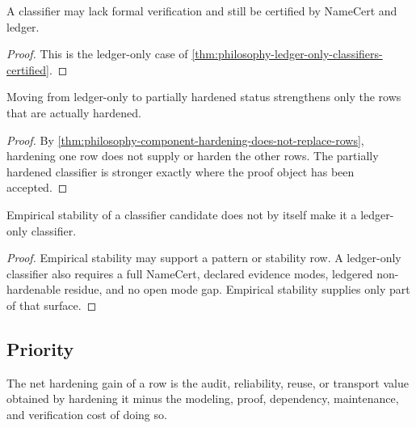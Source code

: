 \begin{corollary}
\label{cor:philosophy-no-formal-proof-not-no-certificate}
A classifier may lack formal verification and still be certified by
NameCert and ledger.
\end{corollary}
\begin{proof}
This is the ledger-only case of
\autoref{thm:philosophy-ledger-only-classifiers-certified}.
\end{proof}

\begin{theorem}
\label{thm:philosophy-partial-hardening-local}
Moving from ledger-only to partially hardened status strengthens only
the rows that are actually hardened.
\end{theorem}
\begin{proof}
By \autoref{thm:philosophy-component-hardening-does-not-replace-rows},
hardening one row does not supply or harden the other rows. The
partially hardened classifier is stronger exactly where the proof object
has been accepted.
\end{proof}

\begin{theorem}
\label{thm:philosophy-empirical-stability-not-ledger-only-legitimacy}
Empirical stability of a classifier candidate does not by itself make it
a ledger-only classifier.
\end{theorem}
\begin{proof}
Empirical stability may support a pattern or stability row. A ledger-only
classifier also requires a full NameCert, declared evidence modes,
ledgered non-hardenable residue, and no open mode gap. Empirical
stability supplies only part of that surface.
\end{proof}

\subsection{Priority}
\label{subsec:philosophy-hardening-priority}

\begin{definition}
\label{def:philosophy-net-hardening-gain}
The net hardening gain of a row is the audit, reliability, reuse, or
transport value obtained by hardening it minus the modeling, proof,
dependency, maintenance, and verification cost of doing so.
\end{definition}

